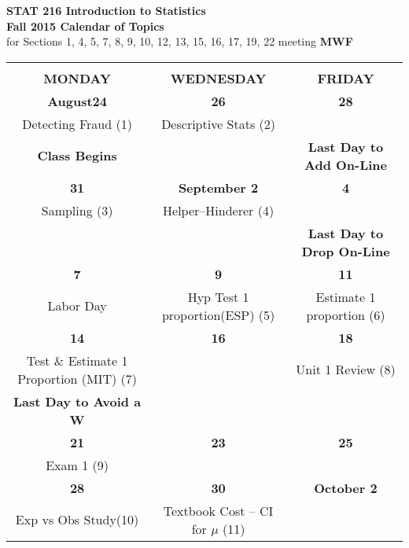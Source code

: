 \begin{center}\tabcolsep=2pt
\vspace{-.5in}
{\LARGE \bf STAT 216 \hspace{.05in} Introduction to Statistics}
\\
{\Large \bf Fall 2015 Calendar of Topics}\\
for Sections   1, 4, 5, 7, 8, 9,  10, 12, 13, 15, 16, 17, 19, 22
meeting {\bf MWF}
\vspace{.1in}\\
\begin{tabular}{|c|c|c|} \hline
 && \\
  \bf{MONDAY} & \bf{WEDNESDAY} & \bf{FRIDAY}  \\
 \hline \hline
   \bf{August}\hfill\bf{24} & \hfill\bf{26}  & \hfill\bf{28}\\
Detecting Fraud \small{(1)} &   Descriptive Stats \small{(2)}& \\
 \small\bf{Class Begins} & &
  \small\bf{Last Day to Add On-Line} \\ \hline
 \hfill\bf{31} & \bf{September} \hfill\bf{2} & \hfill\bf{4} \\
   Sampling  \small{(3)} &  Helper--Hinderer \small{(4)} 
&\\
    \hspace{1in}& \hspace{1in}&\small\bf{ Last Day to Drop On-Line}  \\ \hline
  \hfill\bf{7} & \hfill\bf{9}& \hfill\bf{11} \\
 Labor Day &  Hyp Test 1 proportion(ESP) \small{(5)}  & 
 Estimate 1 proportion \small{(6)}\\
  \hline

 \hfill\bf{14} & \hfill\bf{16} & \hfill\bf{18} \\
 Test \& Estimate 1 Proportion (MIT) \small{(7)}&
 & Unit  1 Review  \small{(8)}  \\
  \small\bf{ Last Day to Avoid a W} &&   \\
   \hline

  \hfill\bf{21} & \hfill\bf{23} & \hfill\bf{25} \\
 Exam 1   \small{(9)}  & &  \\
    \hline

  \hfill\bf{28} & \hfill\bf{30}&   \bf{October} \hfill\bf{2} \\
  Exp vs Obs Study\small{(10)} & Textbook Cost -- CI for $\mu$
  \small{(11)} 
&  \\ \hline


\end{tabular}
\end{center}
